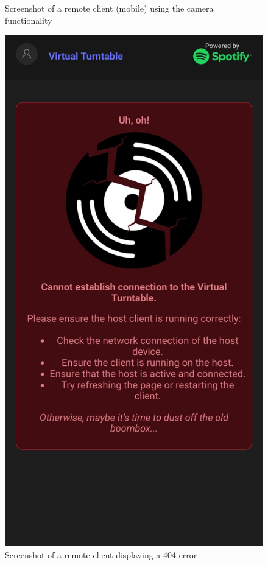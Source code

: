 \begin{uomappendix}
\begin{figure}[H]
\begin{minipage}[b]{0.45\textwidth}
                    \caption{Screenshot of a remote client (mobile) using the camera functionality}
                    \label{fig:phoneCam}
                \end{minipage}
                \hfill
                \begin{minipage}[b]{0.45\textwidth}
                    \centering
                    \includegraphics[width=\textwidth]{images/screenshots/PHONE_Error.jpg}
                    \caption{Screenshot of a remote client displaying a 404 error}
                    \label{fig:phoneError}
                \end{minipage}
            \end{figure}
    

\end{uomappendix}
